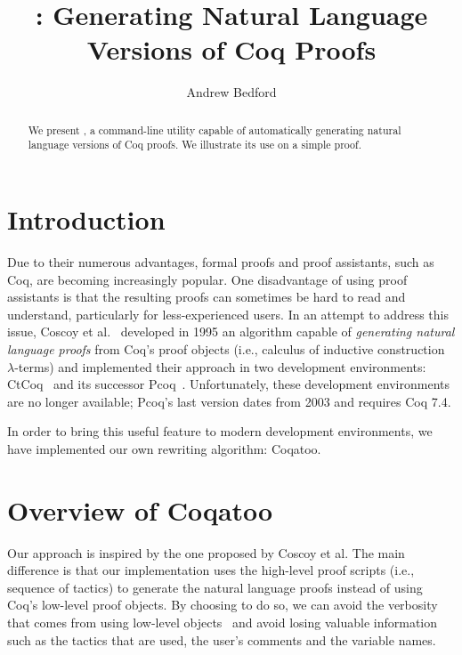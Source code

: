 \documentclass[sigplan,9pt]{acmart}\settopmatter{printfolios=true,printccs=false,printacmref=false}
\begin{document}
\title[Coqatoo]{\coqatoo: Generating Natural Language Versions of Coq Proofs}


\author{Andrew Bedford}


\begin{abstract}
  We present \coqatoo, a command-line utility capable of automatically generating natural language versions of Coq proofs. We illustrate its use on a simple proof.
\end{abstract}

\maketitle

\section{Introduction}
Due to their numerous advantages, formal proofs and proof assistants, such as Coq, are becoming increasingly popular. One disadvantage of using proof assistants is that the resulting proofs can sometimes be hard to read and understand, particularly for less-experienced users. In an attempt to address this issue, Coscoy et al.~\cite{DBLP:conf/tlca/CoscoyKT95} developed in 1995 an algorithm capable of \emph{generating natural language proofs} from Coq's proof objects (i.e., calculus of inductive construction $\lambda$-terms) and implemented their approach in two development environments: CtCoq~\cite{CtCoq} and its successor Pcoq~\cite{Pcoq}. Unfortunately, these development environments are no longer available; Pcoq's last version dates from 2003 and requires Coq 7.4.

In order to bring this useful feature to modern development environments, we have implemented our own rewriting algorithm: Coqatoo.


\section{Overview of Coqatoo}
Our approach is inspired by the one proposed by Coscoy et al. The main difference is that our implementation uses the high-level proof scripts (i.e., sequence of tactics) to generate the natural language proofs instead of using Coq's low-level proof objects. By choosing to do so, we can avoid the verbosity that comes from using low-level objects~\cite{DBLP:conf/lacl/Coscoy96} and avoid losing valuable information such as the tactics that are used, the user's comments and the variable names. 
\end{document}
